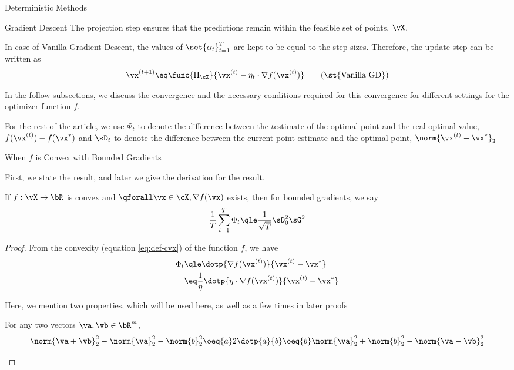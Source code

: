 \documentclass{article}
\newcommand{\x}[1]{\vx^{(#1)}}
\newcommand{\xs}{\vx^{\ast}}
\newcommand{\f}[1]{f(\vx^{(#1)})}
\newcommand{\fs}{f(\vx^\ast)}
\newcommand{\gf}[1]{\nabla f(\vx^{(#1)})}
\newcommand{\ggf}{\nabla f(\vx)}
\newcommand{\fpi}[2]{\func{\Pi_{#1}}{#2}}
\begin{document}
\begin{psection}{Deterministic Methods}
\begin{psubsection}{Gradient Descent}
		The projection step ensures that the predictions remain within the feasible set of points, \ie $\vX$.

		In case of Vanilla Gradient Descent, the values of $\set{\alpha_t}_{t = 1}^T$ are kept to be equal to the step sizes. Therefore, the update step can be written as
		\begin{align}
			\x{t+1}	\eq	\fpi{\cX}{\x{t} - \eta_t \cdot \gf{t}}
			\tag{\st{Vanilla GD}}
			\label{eq:vgd}
		\end{align}

		In the follow subsections, we discuss the convergence and the necessary conditions required for this convergence for different settings for the optimizer function $f$.

		\begin{note}
			For the rest of the article, we use $\Phi_t$ to denote the difference between the $t$\tth estimate of the optimal point and the real optimal value, \ie $\f{t} - \fs$ and $\sD_t$ to denote the difference between the current point estimate and the optimal point, \ie $\norm{\x{t} - \xs}_2$
		\end{note}

		\begin{pssubsection}{When $f$ is Convex with Bounded Gradients}

			First, we state the result, and later we give the derivation for the result.

			\begin{theorem}
				If $f : \vX \to \bR$ is convex and $\qforall \vx \in \cX, \ggf$ exists, then for bounded gradients, we say
				\begin{align}
					\frac{1}{T} \sum_{t = 1}^T \Phi_t	\qle	\frac{1}{\sqrt{T}} \sD_0^2 \sG^2
					\label{eq:gd-cvx-bddg}
				\end{align}
				\label{th:gd-cvx-bddg}

				\begin{proof}
					From the convexity (equation \ref{eq:def-cvx}) of the function $f$, we have
					\begin{align*}
						\Phi_t	&\qle	\dotp{\gf{t}}{\x{t} - \xs} \\
								&\eq	\frac{1}{\eta} \dotp{\eta \cdot \gf{t}}{\x{t} - \xs}
					\end{align*}

					Here, we mention two properties, which will be used here, as well as a few times in later proofs

					\begin{property}
						For any two vectors $\va, \vb \in \bR^m$,
						\begin{equation}
							\norm{\va + \vb}_2^2 - \norm{\va}_2^2 - \norm{b}_2^2	\oeq{a}	2\dotp{a}{b}	\oeq{b}	\norm{\va}_2^2 + \norm{b}_2^2 - \norm{\va - \vb}_2^2
							\label{eq:dotp}
						\end{equation}
					\end{property}


\end{proof}
\end{theorem}
\end{pssubsection}
\end{psubsection}
\end{psection}
\end{document}
